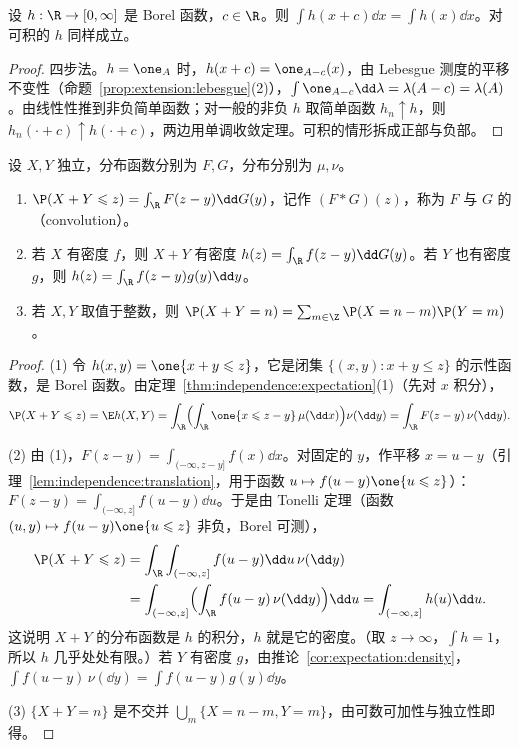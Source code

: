 \begin{lemma}[积分的平移不变性]\label{lem:independence:translation}
设 $h:\R\to[0,\infty]$ 是 Borel 函数，$c\in\R$。则 $\int h(x+c)\dd x=\int h(x)\dd x$。对可积的 $h$ 同样成立。
\end{lemma}
\begin{proof}
四步法。$h=\one_A$ 时，$h(x+c)=\one_{A-c}(x)$，由 Lebesgue 测度的平移不变性（命题~\ref{prop:extension:lebesgue}(2)），$\int\one_{A-c}\dd\lambda=\lambda(A-c)=\lambda(A)$。由线性性推到非负简单函数；对一般的非负 $h$ 取简单函数 $h_n\uparrow h$，则 $h_n(\cdot+c)\uparrow h(\cdot+c)$，两边用单调收敛定理。可积的情形拆成正部与负部。
\end{proof}

\begin{theorem}[卷积公式]\label{thm:independence:convolution}
设 $X,Y$ 独立，分布函数分别为 $F,G$，分布分别为 $\mu,\nu$。
\begin{enumerate}
\item $\P(X+Y\leqslant z)=\int_\R F(z-y)\dd G(y)$，记作 $(F*G)(z)$，称为 $F$ 与 $G$ 的（convolution）。
\item 若 $X$ 有密度 $f$，则 $X+Y$ 有密度 $h(z)=\int_\R f(z-y)\dd G(y)$。若 $Y$ 也有密度 $g$，则 $h(z)=\int_\R f(z-y)g(y)\dd y$。
\item 若 $X,Y$ 取值于整数，则 $\P(X+Y=n)=\sum_{m\in\Z}\P(X=n-m)\P(Y=m)$。
\end{enumerate}
\end{theorem}
\begin{proof}
(1) 令 $h(x,y)=\one\{x+y\leqslant z\}$，它是闭集 $\{(x,y):x+y\leqslant z\}$ 的示性函数，是 Borel 函数。由定理~\ref{thm:independence:expectation}(1)（先对 $x$ 积分），
\[
\P(X+Y\leqslant z)=\E h(X,Y)=\int_\R\Bigl(\int_\R\one\{x\leqslant z-y\}\,\mu(\dd x)\Bigr)\nu(\dd y)=\int_\R F(z-y)\,\nu(\dd y).
\]

(2) 由 (1)，$F(z-y)=\int_{(-\infty,z-y]}f(x)\dd x$。对固定的 $y$，作平移 $x=u-y$（引理~\ref{lem:independence:translation}，用于函数 $u\mapsto f(u-y)\one\{u\leqslant z\}$）：$F(z-y)=\int_{(-\infty,z]}f(u-y)\dd u$。于是由 Tonelli 定理（函数 $(u,y)\mapsto f(u-y)\one\{u\leqslant z\}$ 非负，Borel 可测），
\[
\begin{aligned}
\P(X+Y\leqslant z)&=\int_\R\int_{(-\infty,z]}f(u-y)\dd u\,\nu(\dd y)\\
&=\int_{(-\infty,z]}\Bigl(\int_\R f(u-y)\,\nu(\dd y)\Bigr)\dd u=\int_{(-\infty,z]}h(u)\dd u .
\end{aligned}
\]
这说明 $X+Y$ 的分布函数是 $h$ 的积分，$h$ 就是它的密度。（取 $z\to\infty$，$\int h=1$，所以 $h$ 几乎处处有限。）若 $Y$ 有密度 $g$，由推论~\ref{cor:expectation:density}，$\int f(u-y)\,\nu(\dd y)=\int f(u-y)g(y)\dd y$。

(3) $\{X+Y=n\}$ 是不交并 $\bigcup_m\{X=n-m,Y=m\}$，由可数可加性与独立性即得。
\end{proof}

